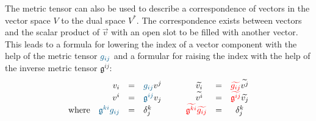 The metric tensor can also be used to describe a correspondence of vectors in the vector
space $V$ to the dual space $V^*$. The correspondence exists between vectors and the
scalar product of $\vec{v}$ with an open slot to be filled with another vector. This leads
to a formula for lowering the index of a vector component with the help of the metric
tensor $\textcolor{MidnightBlue}{g_{ij}}$ and a formular for raising the index with the help of the inverse metric
tensor $\mathfrak{g}^{ij}$:
\begin{equation}
    \begin{array}{rclrcl}
        v_i & = & \textcolor{MidnightBlue}{g_{ij}} v^j \qquad\qquad 
        \widetilde{v_i} & = & \textcolor{red}{\widetilde{g_{ij}}} \widetilde{v^j} \\
        v^i & = & \textcolor{MidnightBlue}{\mathfrak{g}^{ij}} v_j \qquad\qquad
        \widetilde{v^i} & = &
        \textcolor{red}{\widetilde{\mathfrak{g}^{ij}}} \widetilde{v_j} \\
        \text{where}\quad \textcolor{MidnightBlue}{\mathfrak{g}^{ki}}
        \textcolor{MidnightBlue}{g_{ij}} & = &  \delta^k_j \qquad\qquad
        \textcolor{red}{\widetilde{\mathfrak{g}^{ki}}}
        \textcolor{red}{\widetilde{g_{ij}}} & = & \delta^k_j
    \end{array}
\end{equation} \\

\newpage